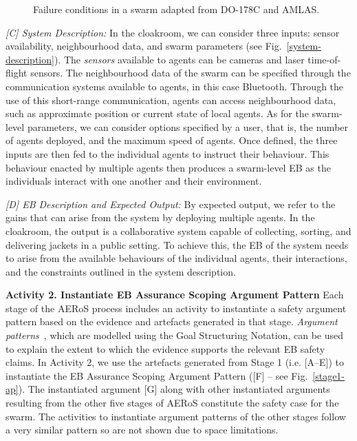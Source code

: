 \documentclass[runningheads]{llncs}
\begin{document}
\begin{figure}[!t]
\begin{minipage}[b]{.5\textwidth}
		\vspace{-4ex}%
		\caption{Failure conditions in a swarm adapted from DO-178C and AMLAS.}
		\label{failure-events}
	\end{minipage}
	\vspace{-6ex} %
\end{figure}

\emph{[C] System Description:}
In the cloakroom, we can consider three inputs: sensor availability, neighbourhood data, and swarm parameters (see Fig.~\ref{system-description}). The \emph{sensors} available to agents can be cameras and laser time-of-flight sensors. 
The neighbourhood data of the swarm can be specified through the communication systems available to agents, in this case Bluetooth. 
Through the use of this short-range communication, agents can access neighbourhood data, such as approximate position or current state of local agents.  
As for the swarm-level parameters, we can consider options specified by a user, that is, the number of agents deployed, and the maximum speed of agents. %
Once defined, the three inputs are then fed to the individual agents to instruct their behaviour. This behaviour enacted by multiple agents then produces a swarm-level EB as the individuals interact with one another and their environment. 

\emph{[D] EB Description and Expected Output:}
By expected output, we refer to the gains that can arise from the system by deploying multiple agents. 
In the cloakroom, the output is a collaborative system capable of collecting, sorting, and delivering jackets in a public setting. 
To achieve this, the EB of the system needs to %
arise from the available behaviours of the individual agents, their interactions, and the constraints outlined in the system description.

\noindent\textbf{Activity 2. Instantiate EB Assurance Scoping Argument Pattern} Each stage of the AERoS process includes an activity to instantiate a safety argument pattern based on the evidence and artefacts generated in that stage. %
\emph{Argument patterns}~\cite{Hawkins2021}, which are modelled using the Goal Structuring Notation, can be used to explain the extent to which the evidence supports the relevant EB safety claims.  
In Activity 2, we use the artefacts generated from Stage 1 (i.e. [A–E]) to instantiate the EB Assurance Scoping Argument Pattern ([F] – see Fig.~\ref{stage1-ap}). 
The instantiated argument [G] along with other instantiated arguments resulting from the other five stages of AERoS constitute the safety case for the swarm. The activities to instantiate argument patterns of the other stages follow a very similar pattern so are not shown due to space limitations.
\end{document}
